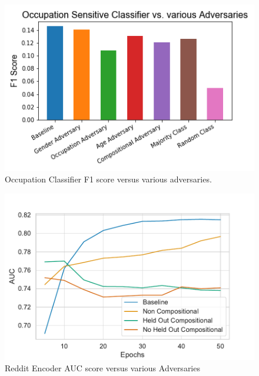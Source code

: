 {\begin{figure}
    \centering
    \includegraphics[width=1\linewidth]{icml2019_style/paper/plots/movielens1m_occF1.png}
    \caption{Occupation Classifier F1 score versus various adversaries.}
    \label{fig:occ_f1}
\end{figure}
}
\begin{figure}
    \centering
    \includegraphics[width=1\linewidth]{icml2019_style/paper/plots/reddit_enc_auc.pdf}
    \caption{Reddit Encoder AUC score versus various Adversaries}
    \label{fig:reddit_enc_auc}
\end{figure}


